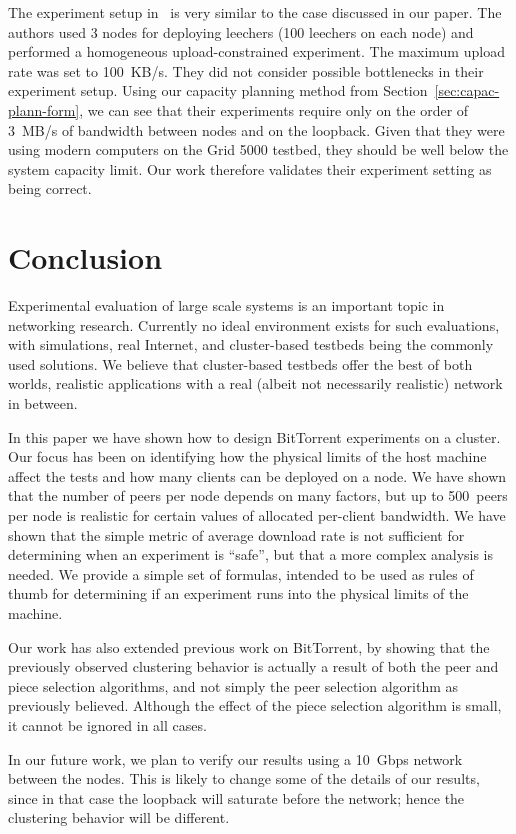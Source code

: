 \documentclass[10pt,letterpaper,twocolumn]{article}
\begin{document}
The experiment setup in~\cite{rao10} is very similar to the case
discussed in our paper. The authors used 3 nodes for deploying
leechers (100 leechers on each node) and performed a homogeneous
upload-constrained experiment. The maximum upload rate was set to
100~KB/s. They did not consider possible bottlenecks in their
experiment setup. Using our capacity planning method from
Section~\ref{sec:capac-plann-form}, we can see that their experiments
require only on the order of 3~MB/s of bandwidth between nodes and on
the loopback. Given that they were using modern computers on the Grid
5000 testbed, they should be well below the system capacity limit. Our
work therefore validates their experiment setting as being correct.









\section{Conclusion}
\label{conclusion}

Experimental evaluation of large scale systems is an important topic
in networking research. Currently no ideal environment exists for such
evaluations, with simulations, real Internet, and cluster-based
testbeds being the commonly used solutions. We believe that
cluster-based testbeds offer the best of both worlds, realistic
applications with a real (albeit not necessarily realistic) network in
between. 

In this paper we have shown how to design BitTorrent experiments on a
cluster. Our focus has been on identifying how the physical limits of
the host machine affect the tests and how many clients can be deployed
on a node. We have shown that the number of peers per node depends on
many factors, but up to 500~peers per node is realistic for certain
values of allocated per-client bandwidth. We have shown that the
simple metric of average download rate is not sufficient for
determining when an experiment is ``safe'', but that a more complex
analysis is needed. We provide a simple set of formulas, intended to
be used as rules of thumb for determining if an experiment runs into
the physical limits of the machine. 

Our work has also extended previous work on BitTorrent, by showing
that the previously observed clustering behavior is actually a result
of both the peer and piece selection algorithms, and not simply the
peer selection algorithm as previously believed. Although the effect
of the piece selection algorithm is small, it cannot be ignored in all
cases. 

In our future work, we plan to verify our results using a 10~Gbps
network between the nodes. This is likely to change some of the
details of our results, since in that case the loopback will saturate
before the network; hence the clustering behavior will be different. 















\end{document}
